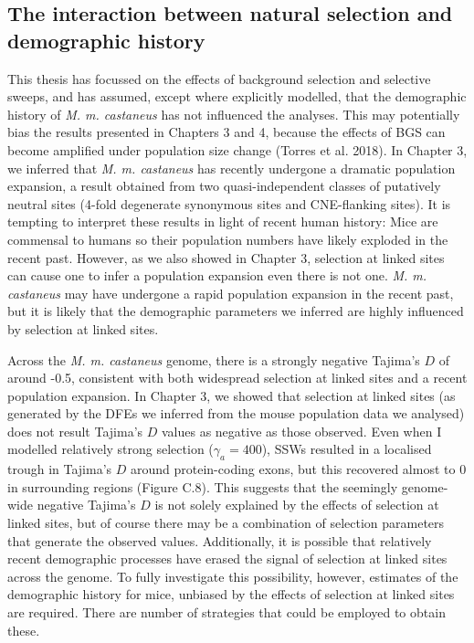 \subsection{The interaction between natural selection and demographic history}

	This thesis has focussed on the effects of background selection and selective sweeps, and has assumed, except where explicitly modelled, that the demographic history of \textit{M. m. castaneus} has not influenced the analyses. This may potentially bias the results presented in Chapters 3 and 4, because the effects of BGS can become amplified under population size change (Torres et al. 2018). In Chapter 3, we inferred that \textit{M. m. castaneus} has recently undergone a dramatic population expansion, a result obtained from two quasi-independent classes of putatively neutral sites (4-fold degenerate synonymous sites and CNE-flanking sites). It is tempting to interpret these results in light of recent human history: Mice are commensal to humans so their population numbers have likely exploded in the recent past. However, as we also showed in Chapter 3, selection at linked sites can cause one to infer a population expansion even there is not one. \textit{M. m. castaneus} may have undergone a rapid population expansion in the recent past, but it is likely that the demographic parameters we inferred are highly influenced by selection at linked sites.
	
	Across the \textit{M. m. castaneus} genome, there is a strongly negative Tajima's $D$ of around -0.5, consistent with both widespread selection at linked sites and a recent population expansion. In Chapter 3, we showed that selection at linked sites (as generated by the DFEs we inferred from the mouse population data we analysed) does not result Tajima's $D$ values as negative as those observed. Even when I modelled relatively strong selection ($\gamma_a = 400$), SSWs resulted in a localised trough in Tajima's $D$ around protein-coding exons, but this recovered almost to 0 in surrounding regions (Figure C.8). This suggests that the seemingly genome-wide negative Tajima's $D$ is not solely explained by the effects of selection at linked sites, but of course there may be a combination of selection parameters that generate the observed values. Additionally, it is possible that relatively recent demographic processes have erased the signal of selection at linked sites across the genome. To fully investigate this possibility, however, estimates of the demographic history for mice, unbiased by the effects of selection at linked sites are required. There are number of strategies that could be employed to obtain these.


